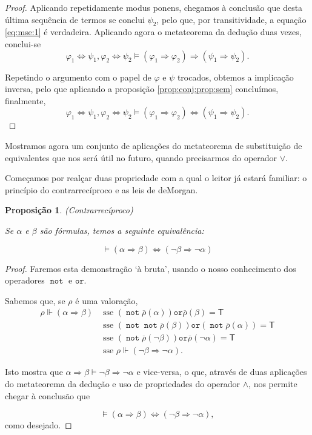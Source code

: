 \documentclass{report}
\newtheorem{prop}{Proposição}
\theoremstyle{definition}
\theoremstyle{remark}
\newcommand{\lt}{\mathsf{T}}
\DeclareMathOperator{\pnot}{\texttt{not}}
\newcommand{\por}{\mathbin{\texttt{or}}}
\newcommand{\imply}{\mathbin{\Rightarrow}}
\newcommand{\eqv}{\mathbin{\Leftrightarrow}}
\begin{document}
\begin{proof}
	Aplicando repetidamente modus ponens, chegamos à conclusão que desta última sequência de termos se conclui $\psi_2$, pelo que, por transitividade, a equação \eqref{eq:mse:1} é verdadeira. Aplicando agora o metateorema da dedução duas vezes, conclui-se
	\[
	\varphi_1 \eqv \psi_1, \varphi_2 \eqv \psi_2  \vDash (\varphi_1 \imply \varphi_2) \imply (\psi_1 \imply \psi_2).
	\]
	
	Repetindo o argumento com o papel de $\varphi$ e $\psi$ trocados, obtemos a implicação inversa, pelo que aplicando a proposição \ref{prop:conj:prop:sem} concluímos, finalmente,
	\[
	\varphi_1 \eqv \psi_1, \varphi_2 \eqv \psi_2  \vDash (\varphi_1 \imply \varphi_2) \eqv (\psi_1 \imply \psi_2).
	\]
	\end{proof}
	
	Mostramos agora um conjunto de aplicações do metateorema de substituição de equivalentes que nos será útil no futuro, quando precisarmos do operador $\lor$.
	
	Começamos por realçar duas propriedade com a qual o leitor já estará familiar: o princípio do contrarrecíproco e as leis de deMorgan.
	
	\begin{prop}
	(Contrarrecíproco)
	
	Se $\alpha$ e $\beta$ são fórmulas, temos a seguinte equivalência:
	
	\begin{equation}
	\vDash (\alpha \imply \beta) \eqv (\neg \beta \imply \neg \alpha)
	\end{equation}
	\end{prop}
	
	\begin{proof}
	Faremos esta demonstração `à bruta', usando o nosso conhecimento dos operadores $\pnot$ e $\por$.
	
	Sabemos que, se $\rho$ é uma valoração,
	\begin{align*}
	\rho \Vdash (\alpha \imply \beta) &\text{ sse } (\pnot \overline\rho(\alpha)) \por \overline\rho(\beta) = \lt\\
	&\text{ sse } (\pnot \pnot \overline\rho(\beta)) \por (\pnot \overline\rho(\alpha)) = \lt\\
	&\text{ sse } (\pnot \overline\rho(\neg \beta)) \por \overline\rho(\neg \alpha) = \lt\\
	&\text{ sse } \rho \Vdash (\neg \beta \imply \neg \alpha).
	\end{align*}
	
	Isto mostra que $\alpha \imply \beta \vDash \neg \beta \imply \neg \alpha$ e vice-versa, o que, através de duas aplicações do metateorema da dedução e uso de propriedades do operador $\land$, nos permite chegar à conclusão que
	
	\begin{equation*}
	\vDash (\alpha \imply \beta) \eqv (\neg \beta \imply \neg \alpha),
	\end{equation*}
	como desejado.
	\end{proof}
	
\end{document}
